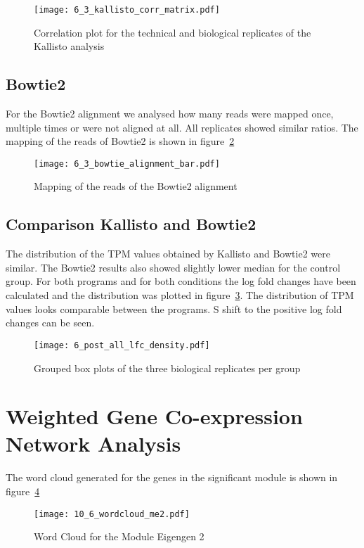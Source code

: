 \begin{figure}[H]
  \center
  \texttt{[image: 6\_3\_kallisto\_corr\_matrix.pdf]}
  \caption{Correlation plot for the technical and biological replicates of the Kallisto
  analysis}\label{fig:corr_kallisto}
\end{figure}

\subsection{Bowtie2}

For the Bowtie2 alignment we analysed how many reads were mapped once, multiple times or were 
not aligned at all. All replicates showed similar ratios. 
The mapping of the reads of Bowtie2 is shown in figure~\ref{fig:bar_bowtie}

\begin{figure}[H]
  \center
  \texttt{[image: 6\_3\_bowtie\_alignment\_bar.pdf]}
  \caption{Mapping of the reads of the Bowtie2 alignment}\label{fig:bar_bowtie}
\end{figure}

\subsection{Comparison Kallisto and Bowtie2}
The distribution of the TPM values obtained by Kallisto and Bowtie2 were similar. 
The Bowtie2 results also showed slightly lower median for the control group.
For both programs and for both conditions the log fold changes have been calculated 
and the distribution was plotted in figure~\ref{fig:dist_lfc}.
The distribution of TPM values looks comparable between the programs. S shift to the positive 
log fold changes can be seen. 

\begin{figure}[H]
  \center
  \texttt{[image: 6\_post\_all\_lfc\_density.pdf]}
  \caption{Grouped box plots of the three biological replicates per group}\label{fig:dist_lfc}
\end{figure}

\section{Weighted Gene Co-expression Network Analysis}

The word cloud generated for the genes in the significant module is shown in figure~\ref{fig:worcloud_wgcna}

\begin{figure}[H]
  \center
  \texttt{[image: 10\_6\_wordcloud\_me2.pdf]}
  \caption{Word Cloud for the Module Eigengen 2}\label{fig:worcloud_wgcna}
\end{figure}


